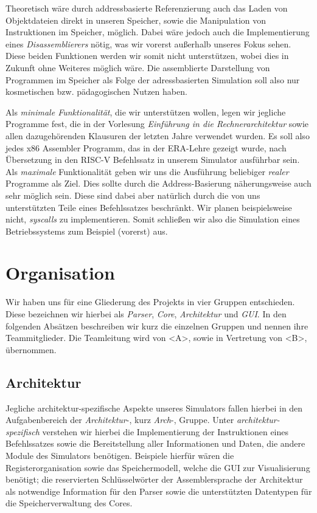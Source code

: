Theoretisch wäre durch addressbasierte Referenzierung auch das Laden von
Objektdateien direkt in unseren Speicher, sowie die Manipulation von
Instruktionen im Speicher, möglich. Dabei wäre jedoch auch die Implementierung
eines \emph{Disassemblierers} nötig, was wir vorerst außerhalb unseres Fokus
sehen. Diese beiden Funktionen werden wir somit nicht unterstützen, wobei dies
in Zukunft ohne Weiteres möglich wäre. Die assemblierte Darstellung von
Programmen im Speicher als Folge der adressbasierten Simulation soll also nur
kosmetischen bzw. pädagogischen Nutzen haben.

Als \emph{minimale Funktionalität}, die wir unterstützen wollen, legen wir
jegliche Programme fest, die in der Vorlesung \emph{Einführung in die
  Rechnerarchitektur} sowie allen dazugehörenden Klausuren der letzten Jahre
verwendet wurden. Es soll also jedes x86 Assembler Programm, das in der
ERA-Lehre gezeigt wurde, nach Übersetzung in den RISC-V Befehlssatz in unserem
Simulator ausführbar sein. Als \emph{maximale} Funktionalität geben wir uns die
Ausführung beliebiger \emph{realer} Programme als Ziel. Dies sollte durch die
Address-Basierung näherungsweise auch sehr möglich sein. Diese sind dabei aber
natürlich durch die von uns unterstützten Teile eines Befehlssatzes
beschränkt. Wir planen beispielsweise nicht, \emph{syscalls} zu
implementieren. Somit schließen wir also die Simulation eines Betriebssystems
zum Beispiel (vorerst) aus.

\section{Organisation}

Wir haben uns für eine Gliederung des Projekts in vier Gruppen entschieden.
Diese bezeichnen wir hierbei als \emph{Parser}, \emph{Core}, \emph{Architektur}
und \emph{GUI}. In den folgenden Absätzen beschreiben wir kurz die einzelnen
Gruppen und nennen ihre Teammitglieder. Die Teamleitung wird von <A>, sowie in
Vertretung von <B>, übernommen.

\subsection{Architektur}

Jegliche architektur-spezifische Aspekte
unseres Simulators fallen hierbei in den Aufgabenbereich der
\emph{Architektur}-, kurz \emph{Arch}-, Gruppe. Unter
\emph{architektur-spezifisch} verstehen wir hierbei die Implementierung der
Instruktionen eines Befehlssatzes sowie die Bereitstellung aller Informationen
und Daten, die andere Module des Simulators benötigen. Beispiele hierfür wären
die Registerorganisation sowie das Speichermodell, welche die GUI zur
Visualisierung benötigt; die reservierten Schlüsselwörter der Assemblersprache
der Architektur als notwendige Information für den Parser sowie die
unterstützten Datentypen für die Speicherverwaltung des Cores.


